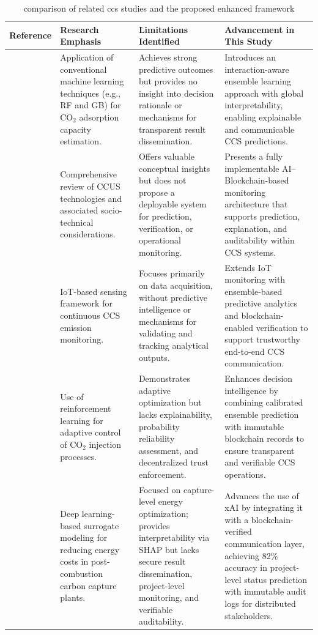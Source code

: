 \documentclass[conference]{IEEEtran}
\begin{document}
\begin{table}[htbp]
\centering
\caption{comparison of related ccs studies and the proposed enhanced framework}
\label{tab:compare}
\begin{tabular}{p{1.8cm}p{4cm}p{4.8cm}p{4.5cm}}
\hline \toprule
\textbf{Reference} & \textbf{Research Emphasis} & \textbf{Limitations Identified} & \textbf{Advancement in This Study} \\
\hline

\cite{alanazi2023machine} &
Application of conventional machine learning techniques (e.g., RF and GB) for CO$_2$ adsorption capacity estimation. &
Achieves strong predictive outcomes but provides no insight into decision rationale or mechanisms for transparent result dissemination. &
Introduces an interaction-aware ensemble learning approach with global interpretability, enabling explainable and communicable CCS predictions. \\
\hline

\cite{mclaughlin2023carbon} &
Comprehensive review of CCUS technologies and associated socio-technical considerations. &
Offers valuable conceptual insights but does not propose a deployable system for prediction, verification, or operational monitoring. &
Presents a fully implementable AI--Blockchain-based monitoring architecture that supports prediction, explanation, and auditability within CCS systems. \\
\hline

\cite{bhatti2024aiot} &
IoT-based sensing framework for continuous CCS emission monitoring. &
Focuses primarily on data acquisition, without predictive intelligence or mechanisms for validating and tracking analytical outputs. &
Extends IoT monitoring with ensemble-based predictive analytics and blockchain-enabled verification to support trustworthy end-to-end CCS communication. \\
\hline

\cite{tyagi2025applying} &
Use of reinforcement learning for adaptive control of CO$_2$ injection processes. &
Demonstrates adaptive optimization but lacks explainability, probability reliability assessment, and decentralized trust enforcement. &
Enhances decision intelligence by combining calibrated ensemble prediction with immutable blockchain records to ensure transparent and verifiable CCS operations. \\ \hline

\cite{aliyon2023use} & Deep learning-based surrogate modeling for reducing energy costs in post-combustion carbon capture plants. & Focused on capture-level energy optimization; provides interpretability via SHAP but lacks secure result dissemination, project-level monitoring, and verifiable auditability. & Advances the use of xAI by integrating it with a blockchain-verified communication layer, achieving 82\% accuracy in project-level status prediction with immutable audit logs for distributed stakeholders. \\ \hline


\end{tabular}
\end{table}
\end{document}
